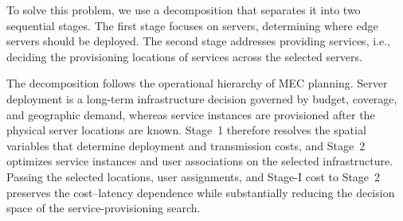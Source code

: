\documentclass[10pt, conference, letterpaper]{IEEEtran}
\newenvironment{revision}{\begingroup\color{blue}}{\endgroup}
\newenvironment{revision}{\begingroup}{\endgroup}
\begin{document}
To solve this problem, we use a decomposition that separates it into two sequential stages. The first stage focuses on servers, determining where edge servers should be deployed. The second stage addresses providing services, i.e., deciding the provisioning locations of services across the selected servers. 

\begin{revision}
The decomposition follows the operational hierarchy of MEC planning. Server deployment is a long-term infrastructure decision governed by budget, coverage, and geographic demand, whereas service instances are provisioned after the physical server locations are known. Stage~1 therefore resolves the spatial variables that determine deployment and transmission costs, and Stage~2 optimizes service instances and user associations on the selected infrastructure. Passing the selected locations, user assignments, and Stage-I cost to Stage~2 preserves the cost--latency dependence while substantially reducing the decision space of the service-provisioning search.
\end{revision}
\end{document}
